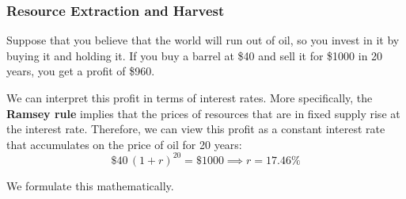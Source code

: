 \documentclass{article}
\begin{document}
    \subsubsection{Resource Extraction and Harvest}

      \begin{example}
        \label{ex:ramsey-rule-for-an-exhaustible-resource}
        Suppose that you believe that the world will run out of oil, so you invest in it by buying it and holding it. If you buy a barrel at \$40 and sell it for \$1000 in 20 years, you get a profit of \$960. 

        We can interpret this profit in terms of interest rates. More specifically, the \textbf{Ramsey rule} implies that the prices of resources that are in fixed supply rise at the interest rate. Therefore, we can view this profit as a constant interest rate that accumulates on the price of oil for 20 years: 
        \begin{equation}
          \$40 \, (1 + r)^{20} = \$1000 \implies r = 17.46\%
        \end{equation}
      \end{example}

      We formulate this mathematically. 
\end{document}
